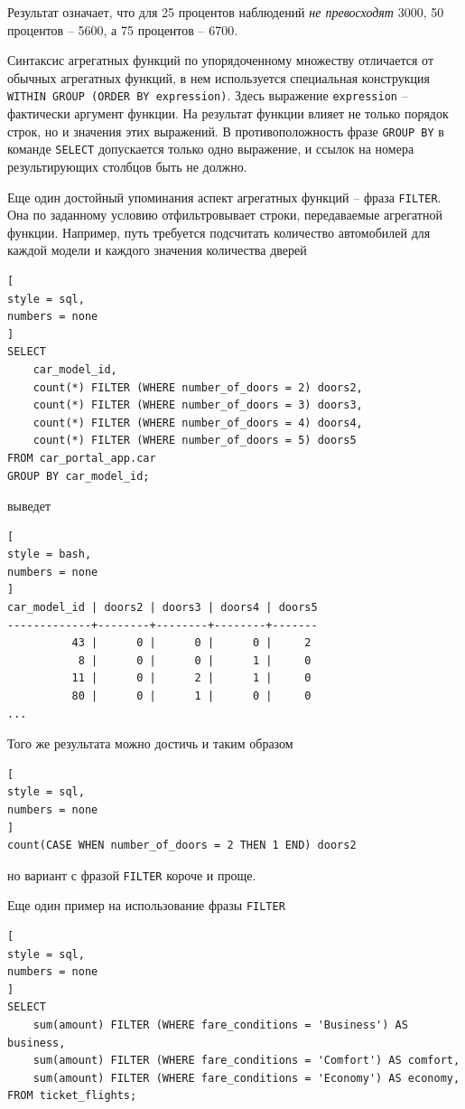 \documentclass[%
	11pt,
	a4paper,
	utf8,
		]{article}
\begin{document}
Результат означает, что для 25 процентов наблюдений \emph{не превосходят} 3000, 50 процентов -- 5600, а 75 процентов -- 6700.

Синтаксис агрегатных функций по упорядоченному множеству отличается от обычных агрегатных функций, в нем используется специальная конструкция \texttt{WITHIN GROUP (ORDER BY expression)}. Здесь выражение \texttt{expression} -- фактически аргумент функции. На результат функции влияет не только порядок строк, но и значения этих выражений. В противоположность фразе \texttt{GROUP BY} в команде \texttt{SELECT} допускается только одно выражение, и ссылок на номера результирующих столбцов быть не должно.

Еще один достойный упоминания аспект агрегатных функций -- фраза \texttt{FILTER}. Она по заданному условию отфильтровывает строки, передаваемые агрегатной функции. Например, путь требуется подсчитать количество автомобилей для каждой модели и каждого значения количества дверей
\begin{lstlisting}[
style = sql,
numbers = none
]
SELECT
    car_model_id,
    count(*) FILTER (WHERE number_of_doors = 2) doors2,
    count(*) FILTER (WHERE number_of_doors = 3) doors3,
    count(*) FILTER (WHERE number_of_doors = 4) doors4,
    count(*) FILTER (WHERE number_of_doors = 5) doors5
FROM car_portal_app.car
GROUP BY car_model_id;
\end{lstlisting}
выведет
\begin{lstlisting}[
style = bash,
numbers = none
]
car_model_id | doors2 | doors3 | doors4 | doors5
-------------+--------+--------+--------+-------
          43 |      0 |      0 |      0 |     2
           8 |      0 |      0 |      1 |     0
          11 |      0 |      2 |      1 |     0
          80 |      0 |      1 |      0 |     0
...
\end{lstlisting}

Того же результата можно достичь и таким образом
\begin{lstlisting}[
style = sql,
numbers = none
]
count(CASE WHEN number_of_doors = 2 THEN 1 END) doors2
\end{lstlisting}
но вариант с фразой \texttt{FILTER} короче и проще.

Еще один пример на использование фразы \texttt{FILTER}
\begin{lstlisting}[
style = sql,
numbers = none
]
SELECT
    sum(amount) FILTER (WHERE fare_conditions = 'Business') AS business,
    sum(amount) FILTER (WHERE fare_conditions = 'Comfort') AS comfort,
    sum(amount) FILTER (WHERE fare_conditions = 'Economy') AS economy,
FROM ticket_flights;
\end{lstlisting}
\end{document}
